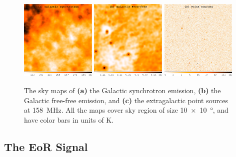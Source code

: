 \documentclass[modern]{aastex62}
\begin{document}
\begin{figure}
  \centering
  \includegraphics[width=0.32\textwidth]{gsyn-f158-heat}
  \includegraphics[width=0.32\textwidth]{gff-f158-heat}
  \includegraphics[width=0.32\textwidth]{pointsources-f158-heat-log}
  \caption{\label{fig:map-fg-other}%
    The sky maps of
    \textbf{(a)} the Galactic synchrotron emission,
    \textbf{(b)} the Galactic free-free emission, and
    \textbf{(c)} the extragalactic point sources
    at \SI{158}{\MHz}.
    All the maps cover sky region of size
    \SI[product-units=repeat]{10 x 10}{\degree},
    and have color bars in units of \si{\kelvin}.
  }
\end{figure}


\subsection{The EoR Signal}
\label{sec:eor-signal}
\end{document}
